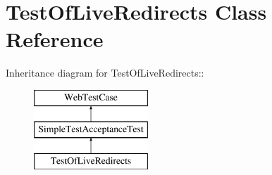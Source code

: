 \hypertarget{class_test_of_live_redirects}{
\section{TestOfLiveRedirects Class Reference}
\label{class_test_of_live_redirects}
}
Inheritance diagram for TestOfLiveRedirects::\begin{figure}[H]
\begin{center}
\leavevmode
\includegraphics[height=3cm]{class_test_of_live_redirects}
\end{center}
\end{figure}

